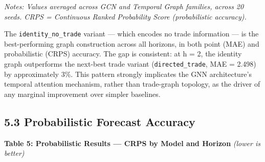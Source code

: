 \documentclass[
  11pt,
  a4paper]{article}
\begin{document}
\emph{Notes: Values averaged across GCN and Temporal Graph families,
across 20 seeds. CRPS = Continuous Ranked Probability Score
(probabilistic accuracy).}

The \texttt{identity\_no\_trade} variant --- which encodes no trade
information --- is the best-performing graph construction across all
horizons, in both point (MAE) and probabilistic (CRPS) accuracy. The gap
is consistent: at h = 2, the identity graph outperforms the next-best
trade variant (\texttt{directed\_trade}, MAE = 2.498) by approximately
3\%. This pattern strongly implicates the GNN architecture's temporal
attention mechanism, rather than trade-graph topology, as the driver of
any marginal improvement over simpler baselines.

\subsection{5.3 Probabilistic Forecast
Accuracy}\label{probabilistic-forecast-accuracy}

\textbf{Table 5: Probabilistic Results --- CRPS by Model and Horizon}
\emph{(lower is better)}
\end{document}
